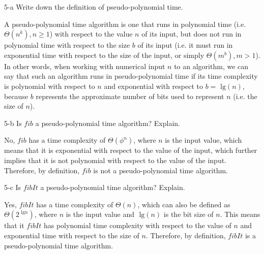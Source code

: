 \documentclass[11pt]{article}
\newcommand{\tlg}{\text{ lg}}
\begin{document}
\begin{prob}{5-a}
Write down the definition of pseudo-polynomial time.
\end{prob}
\begin{sol}
\begin{define}
A pseudo-polynomial time algorithm is one that runs in polynomial time (i.e. $\Theta(n^{k}), n \geq 1$) with respect to the value $n$ of its input, but does not run in polynomial time with respect to the size $b$ of its input (i.e. it must run in exponential time with respect to the size of the input, or simply $\Theta(m^{b}), m > 1$). In other words, when working with numerical input $n$ to an algorithm, we can say that such an algorithm runs in pseudo-polynomial time if its time complexity is polynomial with respect to $n$ and exponential with respect to $b = \tlg (n)$, because $b$ represents the approximate number of bits used to represent $n$ (i.e. the size of $n$).
\end{define}
\end{sol}

\begin{prob}{5-b}
Is $fib$ a pseudo-polynomial time algorithm? Explain.
\end{prob}
\begin{sol}

No, $fib$ has a time complexity of $\Theta(\phi^{n})$, where $n$ is the input value, which means that it is exponential with respect to the value of the input, which further implies that it is not polynomial with respect to the value of the input. Therefore, by definition, $fib$ is not a pseudo-polynomial time algorithm.
\end{sol}

\begin{prob}{5-c}
Is $fibIt$ a pseudo-polynomial time algorithm? Explain.
\end{prob}
\begin{sol}

Yes, $fibIt$ has a time complexity of $\Theta(n)$, which can also be defined as $\Theta(2^{\tlg n})$, where $n$ is the input value and $\tlg (n)$ is the bit size of $n$. This means that it $fibIt$ has polynomial time complexity with respect to the value of $n$ and exponential time with respect to the size of $n$. Therefore, by definition, $fibIt$ is a pseudo-polynomial time algorithm.
\end{sol}
\end{document}
